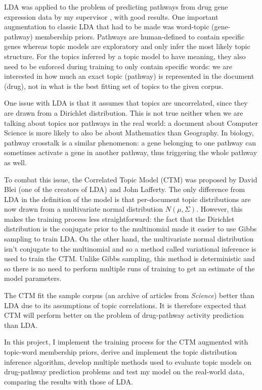 \documentclass[12pt,a4paper,twoside,openright]{report}
\begin{document}
LDA was applied to the problem of predicting pathways from drug gene expression data by my supervisor \cite{Pratanwanich2014}, with good results. One important augmentation to classic LDA that had to be made was word-topic (gene-pathway) membership priors. Pathways are human-defined to contain specific genes whereas topic models are exploratory and only infer the most likely topic structure. For the topics inferred by a topic model to have meaning, they also need to be enforced during training to only contain specific words: we are interested in how much an exact topic (pathway) is represented in the document (drug), not in what is the best fitting set of topics to the given corpus.

One issue with LDA is that it assumes that topics are uncorrelated, since they are drawn from a Dirichlet distribution. This is not true neither when we are talking about topics nor pathways in the real world: a document about Computer Science is more likely to also be about Mathematics than Geography. In biology, pathway crosstalk is a similar phenomenon: a gene belonging to one pathway can sometimes activate a gene in another pathway, thus triggering the whole pathway as well.

To combat this issue, the Correlated Topic Model (CTM) \cite{2007} was proposed by David Blei (one of the creators of LDA) and John Lafferty. The only difference from LDA in the definition of the model is that per-document topic distributions are now drawn from a multivariate normal distribution $N(\mu, \Sigma)$. However, this makes the training process less straightforward: the fact that the Dirichlet distribution is the conjugate prior to the multinomial made it easier to use Gibbs sampling to train LDA. On the other hand, the multivariate normal distribution isn't conjugate to the multinomial and so a method called variational inference is used to train the CTM. Unlike Gibbs sampling, this method is deterministic and so there is no need to perform multiple runs of training to get an estimate of the model parameters.

The CTM fit the sample corpus (an archive of articles from \textit{Science}) better than LDA due to its assumptions of topic correlations. It is therefore expected that CTM will perform better on the problem of drug-pathway activity prediction than LDA.

In this project, I implement the training process for the CTM augmented with topic-word membership priors, derive and implement the topic distribution inference algorithm, develop multiple methods used to evaluate topic models on drug-pathway prediction problems and test my model on the real-world data, comparing the results with those of LDA.
\end{document}
